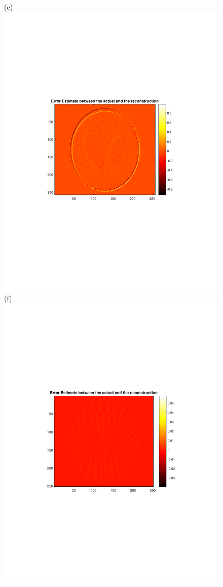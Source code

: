 \documentclass{UCF_ETD}
\begin{document}
\begin{figure}[H]
\begin{center}
(e)\includegraphics[scale=0.3]{SparseViewCT/Error_Recons_NUFFT_ADTVM}
(f)\includegraphics[scale=0.3]{SparseViewCT/Error_Recons_ExactPolar_ADTVM}

\end{center}
\end{figure}
\end{document}
